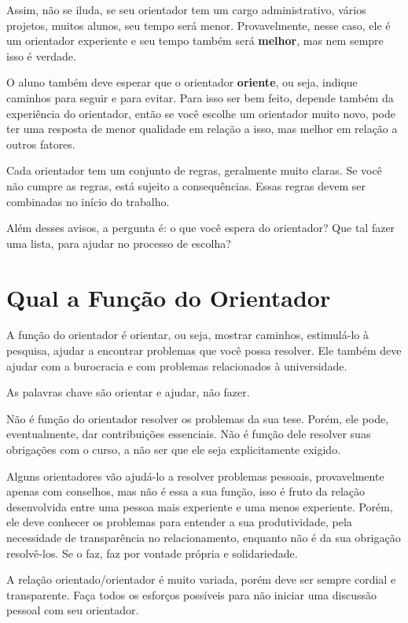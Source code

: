 Assim, não se iluda, se seu orientador tem um cargo administrativo, vários projetos, muitos alunos, seu tempo será menor. Provavelmente, nesse caso, ele é um orientador experiente e seu tempo também será \textbf{melhor}, mas nem sempre isso é verdade.

O aluno também deve esperar que o orientador \textbf{oriente}, ou seja, indique caminhos para seguir e para evitar. Para isso ser bem feito, depende também da experiência do orientador, então se você escolhe um orientador muito novo, pode ter uma resposta de menor qualidade em relação a isso, mas melhor em relação a outros fatores.

Cada orientador tem um conjunto de regras, geralmente muito claras. Se você não cumpre as regras, está sujeito a consequências. Essas regras devem ser combinadas no início do trabalho.

Além desses avisos, a pergunta é: o que você espera do orientador? Que tal fazer uma lista, para ajudar no processo de escolha?

\section{Qual a Função do Orientador}

A função do orientador é orientar, ou seja, mostrar caminhos, estimulá-lo à pesquisa, ajudar a encontrar problemas que você possa resolver. Ele também deve ajudar com a burocracia e com problemas relacionados à universidade. 

As palavras chave são orientar e ajudar, não fazer.

Não é função do orientador resolver os problemas da sua tese. Porém, ele pode, eventualmente, dar contribuições essenciais. Não é função dele resolver suas obrigações com o curso, a não ser que ele seja explicitamente exigido.

Alguns orientadores vão ajudá-lo a resolver problemas pessoais, provavelmente apenas com conselhos, mas não é essa a sua função, isso é fruto da relação desenvolvida entre uma pessoa mais experiente e uma menos experiente. 
Porém, ele deve conhecer os problemas para entender a sua produtividade, pela necessidade de transparência no relacionamento, enquanto não é da sua obrigação resolvê-los. Se o faz, faz por vontade própria e solidariedade.

A relação orientado/orientador é muito variada, porém deve ser sempre cordial e transparente. 
Faça todos os esforços possíveis para não iniciar uma discussão pessoal com seu orientador. 

